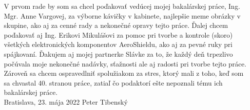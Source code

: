 \null
\vfill
\noindent

V prvom rade by som sa chcel poďakovať vedúcej mojej bakalárskej práce, Ing. Mgr. Anne Vargovej, za výborne kávičky v kabinete, najlepšie meme obrázky v skupine, ako aj za cenné rady a nekonečné opravy tejto práce. Ďalej chcem poďakovať aj Ing. Erikovi Mikulášovi za pomoc pri tvorbe a kontrole (skoro) všetkých elektronických komponentov AeroShieldu, ako aj za pevné ruky pri spájkovaní. Ďakujem aj mojej partnerke Slávke za to, že každý deň trpezlivo počúvala moje nekonečné nadávky, sťažnosti ale aj radosti pri tvorbe tejto práce. Zároveň sa chcem ospravedlniť spolužiakom za stres, ktorý mali z toho, keď som sa chvastal 40. stranou práce, zatiaľ čo podaktorí ešte nepoznali tému ich bakalárskej práce.\\

\noindent Bratislava, 23. mája 2022 \hfill  Peter Tibenský
\cleardoublepage


	

